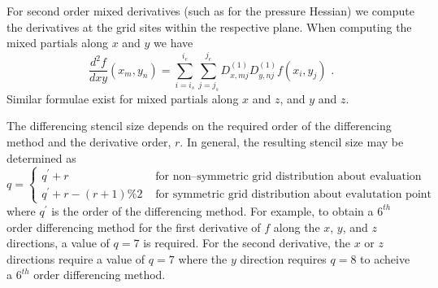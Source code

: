 \documentclass[11pt,letterpaper]{article}
\begin{document}
For second order mixed derivatives (such as for the pressure Hessian) we compute the derivatives at the grid sites within the respective plane. When computing the mixed partials along $x$ and $y$ we have
\begin{equation}
\frac{d^2f}{dxy}(x_m,y_n) = \sum_{i=i_s}^{i_e} \sum_{j=j_s}^{j_e} D^{(1)}_{x,mj} D^{(1)}_{y,nj} f(x_i,y_j) \textbf{ .}
\end{equation}
Similar formulae exist for mixed partials along $x$ and $z$, and $y$ and $z$. 

The differencing stencil size depends on the required order of the differencing method and the derivative order, $r$. In general, the resulting stencil size may be determined as
\begin{equation}
q = 
\begin{cases}
  q^\prime + r & \text{ for non--symmetric grid distribution about evaluation point} \\
  q^\prime +r-(r+1)\%2 & \text{ for symmetric grid distribution about evalutation point} 
\end{cases}
\end{equation}
where $q^\prime$ is the order of the differencing method. For example, to obtain a $6^{th}$ order differencing method for the first derivative of $f$ along the $x$, $y$, and $z$ directions, a value of $q=7$ is required. For the second derivative, the $x$ or $z$ directions require a value of $q=7$ where the $y$ direction requires $q=8$ to acheive a $6^{th}$ order differencing method.



\end{document}
